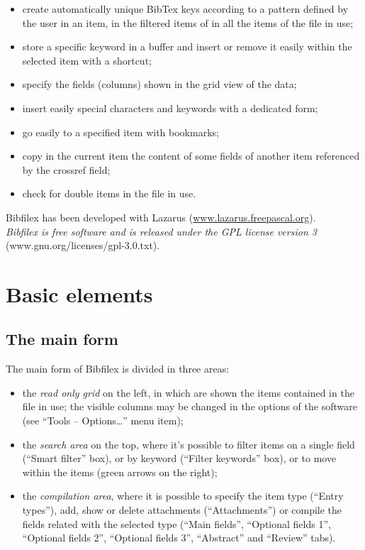 \documentclass[a4paper,12pt]{report}
\begin{document}
\begin{itemize}
\item create automatically unique BibTex keys according to a pattern defined by the user in an item, in the filtered items of in all the items of the file in use;
\item store a specific keyword in a buffer and insert or remove it easily within the selected item with a shortcut;
\item specify the fields (columns) shown in the grid view of the data;
\item insert easily special characters and keywords with a dedicated form;
\item go easily to a specified item with bookmarks;
\item copy in the current item the content of some fields of another item referenced by the crossref field;
\item check for double items in the file in use.

\end{itemize}

Bibfilex has been developed with Lazarus (\url{www.lazarus.freepascal.org}). \\

\textit{Bibfilex is free software and is released under the GPL license version 3} (www.gnu.org/licenses/gpl-3.0.txt).

\chapter{Basic elements}

\section{The main form}

The main form of Bibfilex is divided in three areas: 
\begin{itemize}
  \item the \textit{read only grid} on the left, in which are shown the items contained in the file in use; the visible columns may be changed in the options of the software (see “Tools -- Options\dots” menu item);
  \item the \textit{search area} on the top, where it's possible to filter items on a single field (“Smart filter” box), or by keyword (“Filter keywords” box), or to move within the items (green arrows on the right);
  \item the \textit{compilation area}, where it is possible to specify the item type (“Entry types”), add, show or delete attachments (“Attachments”) or compile the fields related with the selected type (“Main fields”, “Optional fields 1”, “Optional fields 2”, “Optional fields 3”, “Abstract” and “Review” tabs).
\end{itemize}
\end{document}
